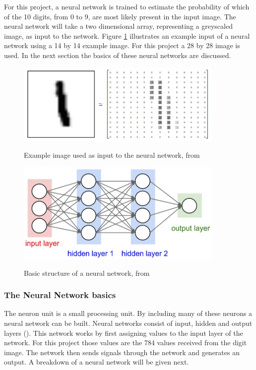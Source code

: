 For this project, a neural network is trained to estimate the probability of which of the 10 digits, from 0 to 9, are most likely present in the input image. The neural network will take a two dimensional array, representing a greyscaled image, as input to the network. Figure \ref{fig:mnist} illustrates an example input of a neural network using a 14 by 14 example image. For this project a 28 by 28 image is used. In the next section the basics of these neural networks are discussed.

\begin{figure}
  \centering
  \includegraphics[width=10cm]{MNIST}\\
  \caption{Example image used as input to the neural network, from \citet{tensor2017}}
  \label{fig:mnist}
\end{figure}

\begin{figure}
  \centering
  \includegraphics[width=10cm]{NN}\\
  \caption{Basic structure of a neural network, from \citet{karpathy2017}}%
  \label{fig:nn}
\end{figure}

\subsubsection{The Neural Network basics}

The neuron unit is a small processing unit. By including many of these neurons a neural network can be built. Neural networks consist of input, hidden and output layers (\citet{MichealN2015}). This network works by first assigning values to the input layer of the network. For this project those values are the 784 values received from the digit image. The network then sends signals through the network and generates an output. A breakdown of a neural network will be given next.

